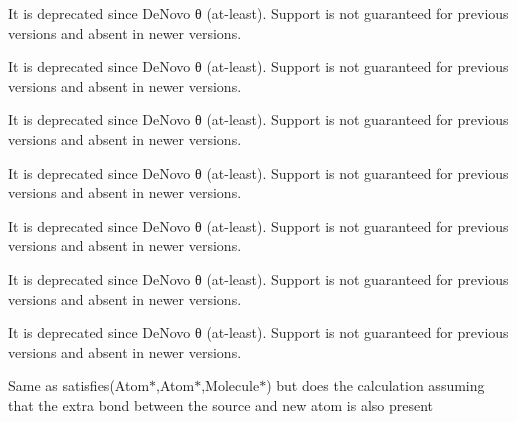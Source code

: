 \begin{DoxyRefList}
\label{deprecated__deprecated000023}%
%
It is deprecated since De\+Novo θ (at-\/least). Support is not guaranteed for previous versions and absent in newer versions. 

\label{deprecated__deprecated000005}%
%
It is deprecated since De\+Novo θ (at-\/least). Support is not guaranteed for previous versions and absent in newer versions. 

\label{deprecated__deprecated000017}%
%
It is deprecated since De\+Novo θ (at-\/least). Support is not guaranteed for previous versions and absent in newer versions.  
\item[Member \mbox{\hyperlink{classchemtools_1_1Rule_ad5ac4e125f4bc662d0e83967de6dcfd4}{chemtools\+::Rule\+::predict\+Dihedral}} (const \mbox{\hyperlink{classForceField}{Force\+Field}} \&ff, \mbox{\hyperlink{classAtom}{Atom}} $\ast$a1, \mbox{\hyperlink{classAtom}{Atom}} $\ast$a2, \mbox{\hyperlink{classAtom}{Atom}} $\ast$a3, \mbox{\hyperlink{classAtom}{Atom}} $\ast$a4)]\label{deprecated__deprecated000024}%
%
It is deprecated since De\+Novo θ (at-\/least). Support is not guaranteed for previous versions and absent in newer versions. 

\label{deprecated__deprecated000006}%
%
It is deprecated since De\+Novo θ (at-\/least). Support is not guaranteed for previous versions and absent in newer versions. 

\label{deprecated__deprecated000018}%
%
It is deprecated since De\+Novo θ (at-\/least). Support is not guaranteed for previous versions and absent in newer versions. 

\label{deprecated__deprecated000012}%
%
It is deprecated since De\+Novo θ (at-\/least). Support is not guaranteed for previous versions and absent in newer versions.  
\item[Member \mbox{\hyperlink{classchemtools_1_1Rule_a0cf5c642e583b5de8365542b343f673e}{chemtools\+::Rule\+::satisfies\+Strong}} (\mbox{\hyperlink{classAtom}{Atom}} $\ast$s, \mbox{\hyperlink{classAtom}{Atom}} $\ast$n, \mbox{\hyperlink{classMolecule}{Molecule}} $\ast$m) const]\label{deprecated__deprecated000015}%
%
Same as satisfies(\+Atom$\ast$,\+Atom$\ast$,\+Molecule$\ast$) but does the calculation assuming that the extra bond between the source and new atom is also present 


\end{DoxyRefList}
